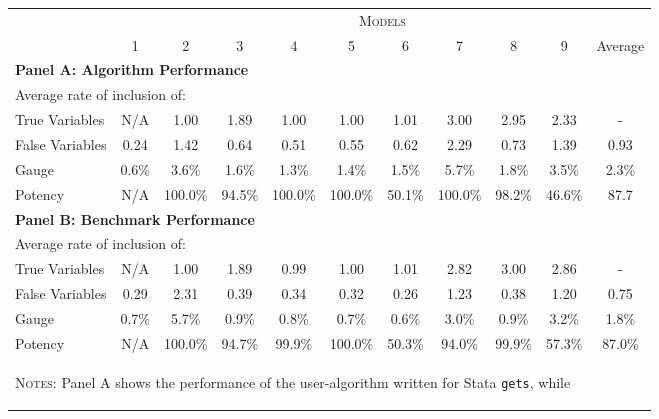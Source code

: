 \documentclass[bib]{statapress}
\begin{document}
\begin{landscape}
\begin{table}[h!]
\centering
\begin{tabular}{l c c c c c c c c c c}\toprule
& \multicolumn{10}{c}{\textsc{Models}} \\
& 1 & 2 & 3 & 4 & 5 & 6 & 7 & 8 & 9 & Average \\ \midrule
\multicolumn{11}{l}{\textbf{Panel A: Algorithm Performance}} \\
\multicolumn{11}{l}{Average rate of inclusion of:} \\
\hspace{4mm} True Variables & N/A & 1.00 & 1.89 & 1.00 & 1.00 & 1.01 & 3.00 & 2.95 & 2.33 & - \\
\hspace{4mm} False Variables & 0.24 & 1.42 & 0.64 & 0.51 & 0.55 & 0.62 & 2.29 & 0.73 & 1.39 & 0.93 \\
Gauge  & 0.6\% & 3.6\% & 1.6\% & 1.3\% & 1.4\% & 1.5\% & 5.7\% & 1.8\% & 3.5\% & 2.3\% \\
Potency  & N/A & 100.0\% & 94.5\% & 100.0\% & 100.0\% & 50.1\% & 100.0\% & 98.2\% & 46.6\% & 87.7 \\ \midrule
\multicolumn{11}{l}{\textbf{Panel B: Benchmark Performance}} \\
\multicolumn{11}{l}{Average rate of inclusion of:} \\
\hspace{4mm} True Variables & N/A & 1.00 & 1.89 & 0.99 & 1.00 & 1.01 & 2.82 & 3.00 & 2.86 & - \\
\hspace{4mm} False Variables & 0.29 & 2.31 & 0.39 & 0.34 & 0.32 & 0.26 & 1.23 & 0.38 & 1.20 & 0.75 \\
Gauge  & 0.7\% & 5.7\% & 0.9\% & 0.8\% & 0.7\% & 0.6\% & 3.0\% & 0.9\% & 3.2\% & 1.8\% \\
Potency  & N/A & 100.0\% & 94.7\% & 99.9\% & 100.0\% & 50.3\% & 94.0\% & 99.9\% & 57.3\% & 87.0\% \\ \bottomrule
\multicolumn{11}{p{17.4cm}}{\begin{footnotesize}\textsc{Notes:} Panel A shows
the performance of the user-algorithm written for Stata \texttt{gets}, while 

\end{footnotesize}}
\end{tabular}
\end{table}
\end{landscape}
\end{document}
